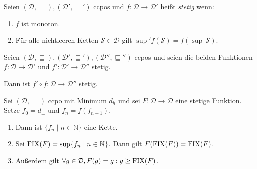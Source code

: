 \par\bigskip
\begin{definition}[Stetigkeit]
    Seien $(\mathcal{D}, \sqsubseteq), (\mathcal{D}',\sqsubseteq')$ ccpos und $f: \mathcal{D} \to \mathcal{D}'$ heißt \emph{stetig} wenn:
    \begin{enumerate}
        \item $f$ ist monoton.
        \item Für alle nichtleeren Ketten $\mathcal{S} \in \mathcal{D}$ gilt $\sup' f(\mathcal{S}) = f(\sup\, \mathcal{S})$.
    \end{enumerate}
\end{definition}

\par\medskip
\begin{observation}
    Seien $(\mathcal{D}, \sqsubseteq), (\mathcal{D}',\sqsubseteq'), (\mathcal{D}'',\sqsubseteq'')$ ccpos und seien die beiden Funktionen $f: \mathcal{D} \to \mathcal{D}'$ und $f': \mathcal{D}' \to \mathcal{D}''$ stetig.

    Dann ist $f' \circ f: \mathcal{D} \to \mathcal{D}''$ stetig.
\end{observation}


\par\bigskip
\begin{theorem}
    Sei $(\mathcal{D}, \sqsubseteq)$ ccpo mit Minimum $d_h$ und sei $F : \mathcal{D} \to \mathcal{D}$ eine stetige Funktion. Setze $f_0 = d_{\bot}$ und $f_n = f(f_{n-1})$.

    \begin{enumerate}
        \item Dann ist $\{ f_n \mid n \in \mathbb{N} \}$ eine Kette.
        \item Sei $\operatorname{FIX}(F) = \sup \{ f_n \mid n \in \mathbb{N} \}$. Dann gilt $F(\operatorname{FIX}(F)) = \operatorname{FIX}(F)$.
        \item Außerdem gilt $\forall g \in \mathcal{D}, F(g) = g: g \geq \operatorname{FIX}(F)$.
    \end{enumerate}
\end{theorem}


